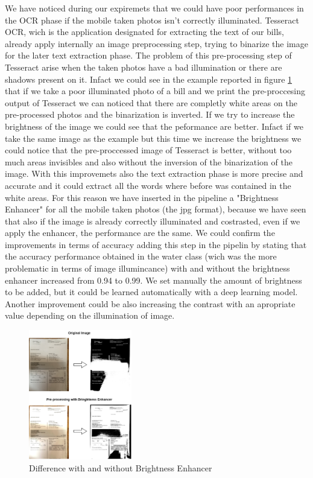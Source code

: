 \documentclass[10pt,twocolumn,letterpaper]{article}
\begin{document}
We have noticed during our expiremets that we could have poor performances
in the OCR phase if the mobile taken photos isn't correctly
illuminated. Tesseract OCR, wich is the application designated for
extracting the text of our bills, already apply
internally an image preprocessing step, trying to binarize the image
for the later text extraction phase. The problem of this
pre-processing step of Tesseract arise when the taken photos have a
bad illumination or there are shadows present on it. Infact we could
see in the example reported in figure
\ref{bright-constrast-experiment} that if we take a poor illuminated
photo of a bill and we print the pre-proccesing output of Tesseract we
can noticed that there are completly white areas on the pre-processed
photos and the binarization is inverted. If we try to
increase the brightness of the image we could see that the peformance
are better. Infact if we take the same image as the example but this
time we increase the brightness we could notice that the
pre-proccessed image of Tesseract is better, without too much areas
invisibles and also without the inversion of the binarization of the
image. With this improvemets also the text extraction phase is more
precise and accurate and it could extract all the words where before
was contained in the white areas. For this reason we have inserted in
the pipeline a "Brightness Enhancer" for all the mobile taken photos
(the jpg format), because we have seen that also if the image is
already correctly illuminated and costrasted, even if we apply the
enhancer, the performance are the same. We could confirm the improvements in terms of accuracy adding this step in the pipelin by stating that the accuracy performance obtained in the water class
(wich was the more problematic in terms of image illumincance) with
and without the brightness enhancer increased from 0.94 to 0.99. We set
manually the amount of brightness to be added, but it could be learned
automatically with a deep learning model. Another improvement could be
also increasing the contrast with an apropriate value depending on
the illumination of image.

\begin{figure}[h]
  \centering
  \includegraphics[width=0.4\textwidth]{images/bright-contrast-experiment.png}
  \caption{Difference with and without Brightness Enhancer}
  \label{bright-constrast-experiment}
\end{figure}
\end{document}
